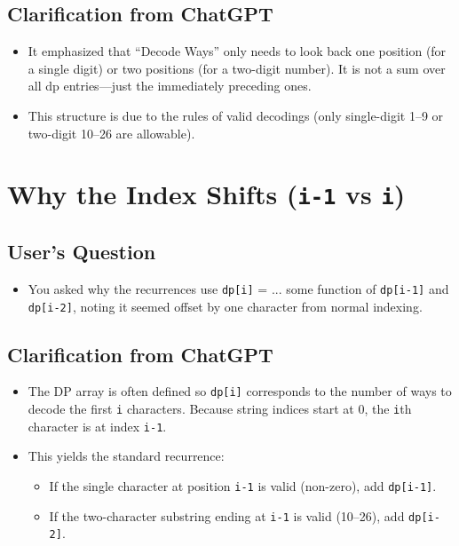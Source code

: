 \documentclass[12pt]{article}
\begin{document}
\subsection{Clarification from ChatGPT}
\begin{itemize}[leftmargin=*, label={--}]
    \item It emphasized that ``Decode Ways'' only needs to look back one position (for a single digit) or two positions (for a two-digit number). It is not a sum over all dp entries---just the immediately preceding ones.
    \item This structure is due to the rules of valid decodings (only single-digit 1--9 or two-digit 10--26 are allowable).
\end{itemize}

\section{Why the Index Shifts (\texttt{i-1} vs \texttt{i})}

\subsection{User’s Question}
\begin{itemize}[leftmargin=*, label={--}]
    \item You asked why the recurrences use \texttt{dp[i]} = ... some function of \texttt{dp[i-1]} and \texttt{dp[i-2]}, noting it seemed offset by one character from normal indexing.
\end{itemize}

\subsection{Clarification from ChatGPT}
\begin{itemize}[leftmargin=*, label={--}]
    \item The DP array is often defined so \texttt{dp[i]} corresponds to the number of ways to decode the first \texttt{i} characters. Because string indices start at 0, the \texttt{i}th character is at index \texttt{i-1}.
    \item This yields the standard recurrence:
    \begin{itemize}[leftmargin=*, label={--}]
        \item If the single character at position \texttt{i-1} is valid (non-zero), add \texttt{dp[i-1]}.
        \item If the two-character substring ending at \texttt{i-1} is valid (10--26), add \texttt{dp[i-2]}.
    \end{itemize}
\end{itemize}
\end{document}
